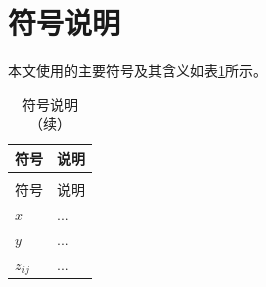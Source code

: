 \section{符号说明}

本文使用的主要符号及其含义如表\ref{tab:符号说明}所示。

\begin{longtable}{>{\centering\arraybackslash}p{}>{\centering\arraybackslash}p{}}
  \caption{符号说明}
  \label{tab:符号说明} \\
  \toprule
  符号 & 说明 \\
  \midrule
  \endfirsthead
  \caption{符号说明（续）} \\
  \toprule
  符号 & 说明 \\
  \midrule
  \endhead
  \bottomrule
  \endfoot
  $x$ & ... \\
  $y$ & ... \\
  $z_{ij}$ & ... \\
\end{longtable}
